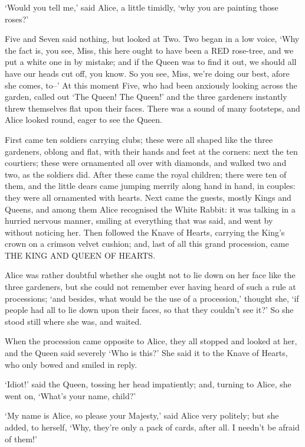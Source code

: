 \documentclass[12pt]{book}
\begin{document}
  `Would you tell me,' said Alice, a little timidly, `why you are
painting those roses?'

  Five and Seven said nothing, but looked at Two.  Two began in a
low voice, `Why the fact is, you see, Miss, this here ought to
have been a RED rose-tree, and we put a white one in by mistake;
and if the Queen was to find it out, we should all have our heads
cut off, you know.  So you see, Miss, we're doing our best, afore
she comes, to--'  At this moment Five, who had been anxiously
looking across the garden, called out `The Queen!  The Queen!'
and the three gardeners instantly threw themselves flat upon
their faces.  There was a sound of many footsteps, and Alice
looked round, eager to see the Queen.

  First came ten soldiers carrying clubs; these were all shaped
like the three gardeners, oblong and flat, with their hands and
feet at the corners:  next the ten courtiers; these were
ornamented all over with diamonds, and walked two and two, as the
soldiers did.  After these came the royal children; there were
ten of them, and the little dears came jumping merrily along hand
in hand, in couples:  they were all ornamented with hearts.  Next
came the guests, mostly Kings and Queens, and among them Alice
recognised the White Rabbit:  it was talking in a hurried nervous
manner, smiling at everything that was said, and went by without
noticing her.  Then followed the Knave of Hearts, carrying the
King's crown on a crimson velvet cushion; and, last of all this
grand procession, came THE KING AND QUEEN OF HEARTS.

  Alice was rather doubtful whether she ought not to lie down on
her face like the three gardeners, but she could not remember
ever having heard of such a rule at processions; `and besides,
what would be the use of a procession,' thought she, `if people
had all to lie down upon their faces, so that they couldn't see it?'
So she stood still where she was, and waited.

  When the procession came opposite to Alice, they all stopped
and looked at her, and the Queen said severely `Who is this?'
She said it to the Knave of Hearts, who only bowed and smiled in reply.

  `Idiot!' said the Queen, tossing her head impatiently; and,
turning to Alice, she went on, `What's your name, child?'

  `My name is Alice, so please your Majesty,' said Alice very
politely; but she added, to herself, `Why, they're only a pack of
cards, after all.  I needn't be afraid of them!'
\end{document}
